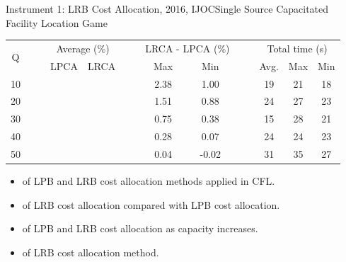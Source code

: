 \documentclass[14pt]{beamer}
\begin{document}
\begin{frame}{Instrument 1: LRB Cost Allocation, {\footnotesize 2016, IJOC}}{Single Source Capacitated Facility Location Game}
\footnotesize
\begin{table}[H]
\centering
\tabcolsep=5pt
\footnotesize
\renewcommand\arraystretch{1.3}
\setlength{\abovecaptionskip}{100pt}
\setlength{\belowcaptionskip}{100pt}
\begin{tabular}[!h]{c c c c c c c c c c c c c c}
\hline
\multirow{2}{*}{Q} &\multicolumn{2}{c}{} & \multicolumn{2}{c}{Average (\%)}  &\multicolumn{2}{c}{} &\multicolumn{2}{c}{LRCA - LPCA (\%)} &\multicolumn{2}{c}{} &\multicolumn{3}{c}{Total time (s)}\\
\cline{4-5}
\cline{8-9}
\cline{12-14}
& && LPCA & LRCA	&& &Max	&Min	&& &Avg. &Max	&Min\\
\hline
10  &&  &{\color{teal}{\bf 97.15}}	&{\color{blue}{\bf 98.79}}	&&	&2.38	&1.00	&&	&19	&21	&18\\

20  &&  &{\color{teal}{\bf 97.20}}	&{\color{blue}{\bf 98.31}}	&&	&1.51	&0.88	&&	&24	&27	&23\\

30  &&  &{\color{teal}{\bf 94.70}}	&{\color{blue}{\bf 95.25}}	&&	&0.75	&0.38	&&	&15 &28	&21\\

40  &&  &{\color{teal}{\bf 94.11}}	&{\color{blue}{\bf 94.25}}	&&	&0.28	&0.07	&&	&24	&24	&23\\

50  &&  &{\color{teal}{\bf 93.87}}	&{\color{blue}{\bf 93.88}}	&&	&0.04	&-0.02	&&	&31	&35	&27\\
\hline
\end{tabular}
\end{table}
\vspace{-1.2em}
\begin{shaded}
\vspace{-0.8em}
\begin{itemize}
\item {\color{red}{Effectiveness}} of LPB and LRB cost allocation methods applied in CFL.
\item {\color{red}{Sharpness}} of LRB cost allocation compared with LPB cost allocation.
\item {\color{red}{Convergence}} of LPB and LRB cost allocation as capacity increases.
\item {\color{red}{Time efficiency}} of LRB cost allocation method.
\end{itemize}
\vspace{-1.2em}
\end{shaded}
\end{frame}
\end{document}
